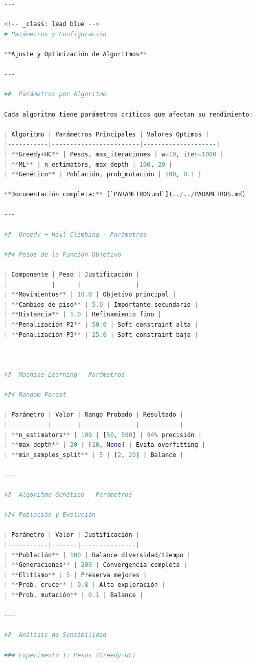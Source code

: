 \begin{itemize}
\begin{itemize}
\begin{itemize}
\begin{itemize}
\begin{itemize}
\begin{itemize}
\begin{enumerate}
\begin{enumerate}
\begin{enumerate}
\begin{enumerate}
\begin{lstlisting}[language=Python]
---

<!-- _class: lead blue -->
# Parámetros y Configuración

**Ajuste y Optimización de Algoritmos**

---

##  Parámetros por Algoritmo

Cada algoritmo tiene parámetros críticos que afectan su rendimiento:

| Algoritmo | Parámetros Principales | Valores Óptimos |
|-----------|------------------------|--------------------|
| **Greedy+HC** | Pesos, max_iteraciones | w=10, iter=1000 |
| **ML** | n_estimators, max_depth | 100, 20 |
| **Genético** | Población, prob_mutación | 100, 0.1 |

**Documentación completa:** [`PARAMETROS.md`](../../PARAMETROS.md)

---

##  Greedy + Hill Climbing - Parámetros

### Pesos de la Función Objetivo

| Componente | Peso | Justificación |
|------------|------|---------------|
| **Movimientos** | 10.0 | Objetivo principal |
| **Cambios de piso** | 5.0 | Importante secundario |
| **Distancia** | 1.0 | Refinamiento fino |
| **Penalización P2** | 50.0 | Soft constraint alta |
| **Penalización P3** | 25.0 | Soft constraint baja |

---

##  Machine Learning - Parámetros

### Random Forest

| Parámetro | Valor | Rango Probado | Resultado |
|-----------|-------|---------------|-----------|
| **n_estimators** | 100 | [50, 500] | 94% precisión |
| **max_depth** | 20 | [10, None] | Evita overfitting |
| **min_samples_split** | 5 | [2, 20] | Balance |

---

##  Algoritmo Genético - Parámetros

### Población y Evolución

| Parámetro | Valor | Justificación |
|-----------|-------|---------------|
| **Población** | 100 | Balance diversidad/tiempo |
| **Generaciones** | 200 | Convergencia completa |
| **Elitismo** | 5 | Preserva mejores |
| **Prob. cruce** | 0.8 | Alta exploración |
| **Prob. mutación** | 0.1 | Balance |

---

##  Análisis de Sensibilidad

### Experimento 1: Pesos (Greedy+HC)


\end{lstlisting}
\end{enumerate}
\end{enumerate}
\end{enumerate}
\end{enumerate}
\end{itemize}
\end{itemize}
\end{itemize}
\end{itemize}
\end{itemize}
\end{itemize}

